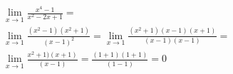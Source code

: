 \begin{ex}
\begin{align}
&\lim_{x\rightarrow 1} \frac{x^4-1}{x^2-2x+1}=\nonumber\\
&\lim_{x\rightarrow 1} \frac{(x^2-1)(x^2+1)}{(x-1)^2}=\lim_{x\rightarrow 1} \frac{(x^2+1)(x-1)(x+1)}{(x-1)(x-1)}=\nonumber\\
&\lim_{x\rightarrow 1} \frac{x^2+1)(x+1)}{(x-1)}=\frac{(1+1)(1+1)}{(1-1)}=0\nonumber
\end{align}
\end{ex}